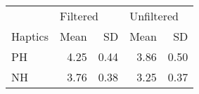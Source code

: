 \begin{tabular}{lrrrr}
\toprule
{} & \multicolumn{2}{l}{Filtered} & \multicolumn{2}{l}{Unfiltered} \\
Haptics &     Mean &   SD &       Mean &   SD \\
\midrule
PH      & 4.25 & 0.44 & 3.86 & 0.50 \\
NH      & 3.76 & 0.38 & 3.25 & 0.37 \\
\bottomrule
\end{tabular}
